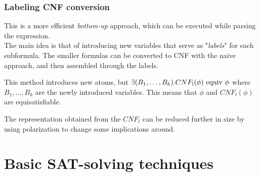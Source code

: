 \documentclass{article}
\begin{document}
\subsubsection{Labeling CNF conversion}
This is a more efficient \textit{bottom-up} approach, which can be executed while parsing the expression.\\
The main idea is that of introducing new variables that serve as "\textit{labels}" for each subformula. The smaller formulas can be converted to CNF with the naive approach, and then assembled through the labels.

This method introduces new atoms, but $\exists(B_1,\dots,B_k).CNF_l(\phi)\ \te{equiv}\ \phi$ where $B_1,\dots,B_k$ are the newly introduced variables. This means that $\phi$ and $CNF_l(\phi)$ are equisatisfiable.

The representation obtained from the $CNF_l$ can be reduced  further in size by using polarization to change some implications around.

\section{Basic SAT-solving techniques}
\end{document}
